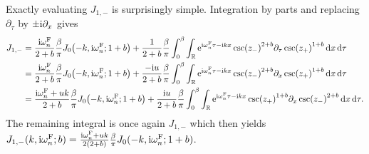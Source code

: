 \documentclass[english, parskip=full]{scrartcl}
\begin{document}
Exactly evaluating $J_{1,-}$ is surprisingly simple.
Integration by parts and replacing $\partial_\tau$ by $\pm\text{i}\partial_x$ gives
\begin{align}
J_{1,-} &= \frac{\i\omega_n^\F}{2+b} \frac{\beta}{\pi} J_0\kla*{-k,\i\omega_n^\F; 1+b} + \frac{1}{2+b} \frac{\beta}{\pi} \intx{0}{\beta}{\intr{\powe{\i\omega_n^\F\tau - \i kx} \csc(z_-)^{2+b} \partial_\tau \csc(z_+)^{1+b}}{x} }{\tau}\\
&= \frac{\i\omega_n^\F}{2+b} \frac{\beta}{\pi} J_0\kla*{-k,\i\omega_n^\F; 1+b} + \frac{-\i u}{2+b} \frac{\beta}{\pi} \intx{0}{\beta}{\intr{\powe{\i\omega_n^\F\tau - \i kx} \csc(z_-)^{2+b} \partial_x \csc(z_+)^{1+b}}{x} }{\tau}\\
&= \frac{\i\omega_n^\F + uk}{2+b} \frac{\beta}{\pi} J_0\kla*{-k,\i\omega_n^\F; 1+b} + \frac{\i u}{2+b} \frac{\beta}{\pi} \intx{0}{\beta}{\intr{\powe{\i\omega_n^\F\tau - \i kx} \csc(z_+)^{1+b} \partial_x \csc(z_-)^{2+b}}{x} }{\tau}.
\end{align}
The remaining integral is once again $J_{1,-}$ which then yields $J_{1,-}(k,\text{i}\omega_n^{\text{F}};b) = \frac{\text{i}\omega_n^{\text{F}} + uk}{2(2+b)} \frac{\beta}{\pi} J_0(-k,\text{i}\omega_n^{\text{F}}; 1+b)$.
\end{document}
